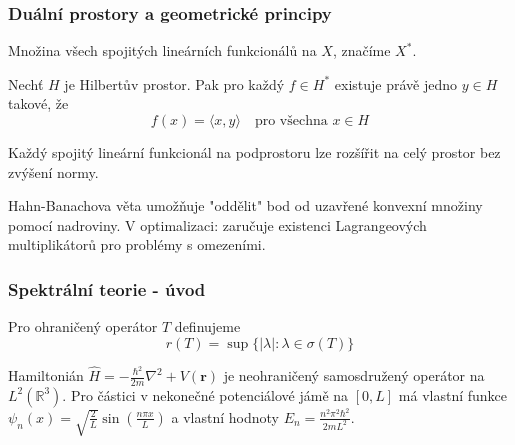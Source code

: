\subsubsection{Duální prostory a geometrické principy}

\begin{definition}
Množina všech spojitých lineárních funkcionálů na $X$, značíme $X^*$.
\end{definition}

\begin{theorem}
Nechť $H$ je Hilbertův prostor. Pak pro každý $f \in H^*$ existuje právě jedno $y \in H$ takové, že
\[
f(x) = \langle x, y \rangle \quad \text{pro všechna } x \in H
\]
\end{theorem}

\begin{theorem}
Každý spojitý lineární funkcionál na podprostoru lze rozšířit na celý prostor bez zvýšení normy.
\end{theorem}

\begin{intuition}
Hahn-Banachova věta umožňuje "oddělit" bod od uzavřené konvexní množiny pomocí nadroviny. V optimalizaci: zaručuje existenci Lagrangeových multiplikátorů pro problémy s omezeními.
\end{intuition}

\begin{center}
\end{center}

\subsubsection{Spektrální teorie - úvod}

\begin{definition}
Pro ohraničený operátor $T$ definujeme
\[
r(T) = \sup\{|\lambda| : \lambda \in \sigma(T)\}
\]
\end{definition}

\begin{example}
Hamiltonián $\hat{H} = -\frac{\hbar^2}{2m}\nabla^2 + V(\mathbf{r})$ je neohraničený samosdružený operátor na $L^2(\mathbb{R}^3)$. Pro částici v nekonečné potenciálové jámě na $[0,L]$ má vlastní funkce $\psi_n(x) = \sqrt{\frac{2}{L}}\sin(\frac{n\pi x}{L})$ a vlastní hodnoty $E_n = \frac{n^2\pi^2\hbar^2}{2mL^2}$.
\end{example}

